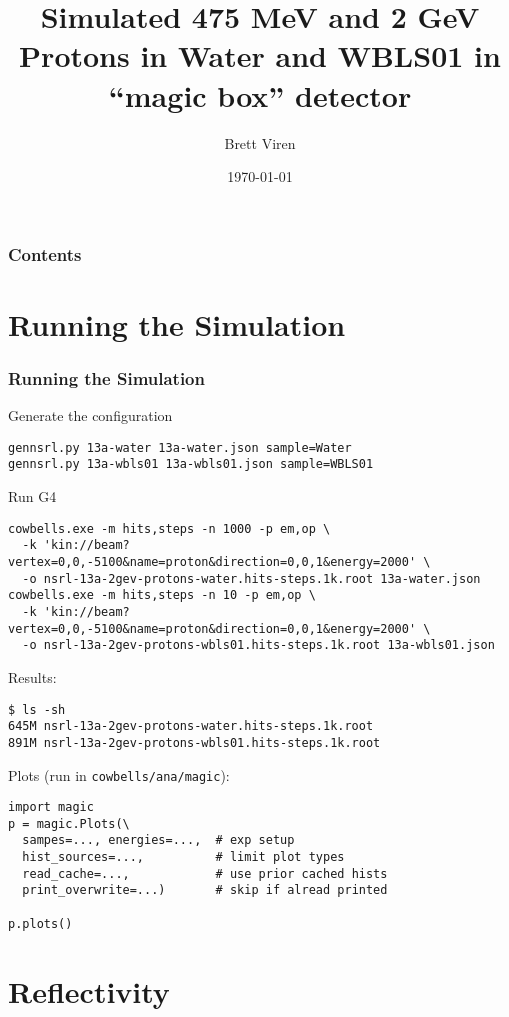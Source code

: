 \documentclass[xcolor=dvipsnames]{beamer}
\begin{document}
\title{Simulated 475 MeV and 2 GeV Protons in Water and WBLS01 in ``magic box'' detector}
\author{Brett Viren}
\date{\today}
\frame{\titlepage}

\begin{frame}
  \frametitle{Contents}
  \tableofcontents
\end{frame}


\section{Running the Simulation}
\label{sec:gen}

\begin{frame}[fragile]
  \frametitle{Running the Simulation}

  Generate the configuration

{\tiny
\begin{verbatim}
gennsrl.py 13a-water 13a-water.json sample=Water
gennsrl.py 13a-wbls01 13a-wbls01.json sample=WBLS01
\end{verbatim}
}

  Run G4

{\tiny
\begin{verbatim}
cowbells.exe -m hits,steps -n 1000 -p em,op \
  -k 'kin://beam?vertex=0,0,-5100&name=proton&direction=0,0,1&energy=2000' \
  -o nsrl-13a-2gev-protons-water.hits-steps.1k.root 13a-water.json 
cowbells.exe -m hits,steps -n 10 -p em,op \
  -k 'kin://beam?vertex=0,0,-5100&name=proton&direction=0,0,1&energy=2000' \
  -o nsrl-13a-2gev-protons-wbls01.hits-steps.1k.root 13a-wbls01.json
\end{verbatim}
}

 Results:
{\tiny
\begin{verbatim}
$ ls -sh
645M nsrl-13a-2gev-protons-water.hits-steps.1k.root
891M nsrl-13a-2gev-protons-wbls01.hits-steps.1k.root
\end{verbatim}
}

Plots (run in \texttt{cowbells/ana/magic}):
{\tiny
  \begin{lstlisting}[lang=python]
import magic
p = magic.Plots(\
  sampes=..., energies=...,  # exp setup
  hist_sources=...,          # limit plot types
  read_cache=...,            # use prior cached hists
  print_overwrite=...)       # skip if alread printed

p.plots()
  \end{lstlisting}
}
\end{frame}



\section{Reflectivity}
\end{document}
